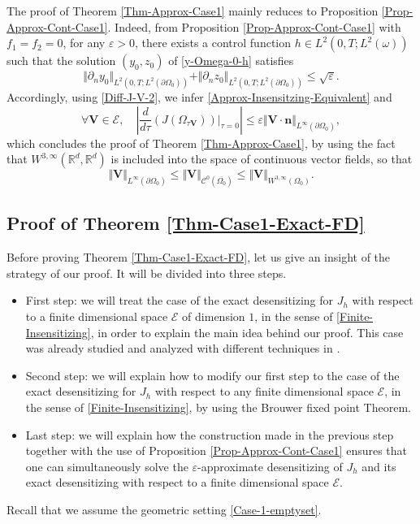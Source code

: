 \documentclass[11pt]{article}
\numberwithin{equation}{section}
\newcommand{\bn}{\boldsymbol{n}}
\newcommand{\bV}{\boldsymbol{V}}
\newcommand\R{{\mathbb R}}
\newcommand{\norm}[1]{\Vert#1\Vert}
\theoremstyle{definition}
\begin{document}
The proof of Theorem \ref{Thm-Approx-Case1} mainly reduces to Proposition \ref{Prop-Approx-Cont-Case1}. Indeed, from Proposition \ref{Prop-Approx-Cont-Case1} with $f_1=f_2=0$, for any $\varepsilon >0$, there exists a control function $h \in L^2(0,T; L^2(\omega))$ such that the solution $(y_0,z_0)$ of \eqref{y-Omega-0-h} satisfies
\begin{equation}
\label{Small-Neumann-Data}
\norm{\partial_n y_0}_{L^2(0,T;L^2(\partial\Omega_0))} + \norm{\partial_n z_0}_{L^2(0,T;L^2(\partial\Omega_0))}\leq \sqrt{\varepsilon}.
\end{equation}
Accordingly, using \eqref{Diff-J-V-2}, we infer {\eqref{Approx-Insensitzing-Equivalent} and}
\[
\forall \bV \in \mathcal{E},\quad \left| \dfrac{d }{d \tau}\left({J}\left(\Omega_{\tau\bV} \right)\right)\Big|_{\tau=0}\right|
\leq \varepsilon\norm{\bV\cdot \bn}_{L^\infty(\partial \Omega_0)},
\]
which concludes the proof of Theorem \ref{Thm-Approx-Case1}, by using the fact that $W^{3,\infty}(\R^d,\R^d)$ is included into the space of continuous vector fields, so that
\[
\Vert \bV\Vert_{L^\infty(\partial\Omega_0)}\leq \Vert \bV\Vert_{\mathscr{C}^0(\overline{\Omega_0})}\leq \Vert \bV\Vert_{W^{3,\infty}(\Omega_0)}.
\]

\subsection{Proof of Theorem \ref{Thm-Case1-Exact-FD}}\label{Subsec-Proof-Exact-Case1}
Before proving Theorem \ref{Thm-Case1-Exact-FD}, let us give an insight of the strategy of our proof. It will be divided into three steps.
\begin{itemize}
\item First step: we will treat the case of the exact {desensitizing} for $J_h$ with respect to a finite dimensional space $\mathcal E$ of dimension $1$, in the sense of \eqref{Finite-Insensitizing}, in order to explain the main idea behind our proof. This case was already studied and analyzed with different techniques in \cite{Lissy-Privat-Simpore}.
\item Second step: we will explain how to modify our first step to the case of the exact {desensitizing} for $J_h$ with respect to any finite dimensional space $\mathcal E$, in the sense of \eqref{Finite-Insensitizing}, by using the Brouwer fixed point Theorem.
\item Last step: we will explain how the construction made in the previous step together with the use of Proposition \ref{Prop-Approx-Cont-Case1} ensures that {one can simultaneously solve the $\varepsilon$-approximate desensitizing of $J_h$ and its exact desensitizing with respect to a finite dimensional space $\mathcal{E}$.}
\end{itemize}
Recall that we assume the geometric setting \eqref{Case-1-emptyset}.
\end{document}
